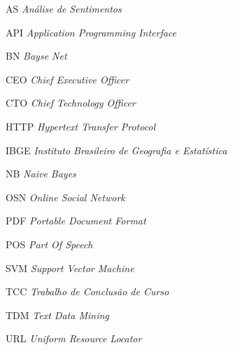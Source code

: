 \begin{siglas}
   \item[AS]{\textit{Análise de Sentimentos}}
   \item[API]{\textit{Application Programming Interface}}
   \item[BN]{\textit{Bayse Net}}
   \item[CEO]{\textit{Chief Executive Officer}}
   \item[CTO]{\textit{Chief Technology Officer}}
   \item[HTTP]{\textit{Hypertext Transfer Protocol}}
   \item[IBGE]{\textit{Instituto Brasileiro de Geografia e Estatística}}
   \item[NB]{\textit{Naive Bayes}}
   \item[OSN]{\textit{Online Social Network}}
   \item[PDF]{\textit{Portable Document Format}}
   \item[POS]{\textit{Part Of Speech}}
   \item[SVM]{\textit{Support Vector Machine}}
   \item[TCC]{\textit{Trabalho de Conclusão de Curso}}
   \item[TDM]{\textit{Text Data Mining}}
   \item[URL]{\textit{Uniform Resource Locator}}
\end{siglas}
